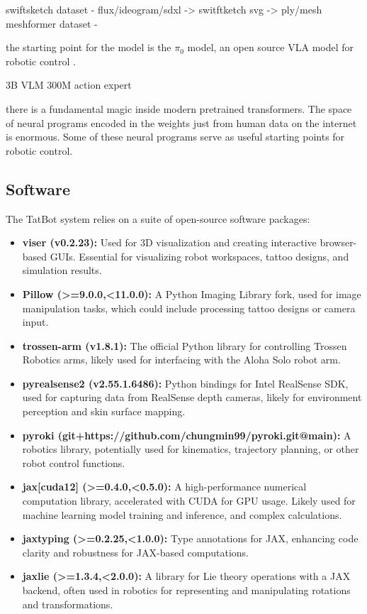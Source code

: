 \documentclass[11pt]{article}
\begin{document}
swiftsketch dataset - flux/ideogram/sdxl -> switftketch svg -> ply/mesh
meshformer dataset -

the starting point for the model is the $\pi_0$ model, an open source VLA model for robotic control \cite{Black2024pi0}.

3B VLM
300M action expert

there is a fundamental magic inside modern pretrained transformers.
The space of neural programs encoded in the weights just from human data on the internet is enormous. 
Some of these neural programs serve as useful starting points for robotic control.

\subsection{Software}

The TatBot system relies on a suite of open-source software packages:
\begin{itemize}
    \item \textbf{viser (v0.2.23):} Used for 3D visualization and creating interactive browser-based GUIs. Essential for visualizing robot workspaces, tattoo designs, and simulation results.
    \item \textbf{Pillow (>=9.0.0,<11.0.0):} A Python Imaging Library fork, used for image manipulation tasks, which could include processing tattoo designs or camera input.
    \item \textbf{trossen-arm (v1.8.1):} The official Python library for controlling Trossen Robotics arms, likely used for interfacing with the Aloha Solo robot arm.
    \item \textbf{pyrealsense2 (v2.55.1.6486):} Python bindings for Intel RealSense SDK, used for capturing data from RealSense depth cameras, likely for environment perception and skin surface mapping.
    \item \textbf{pyroki (git+https://github.com/chungmin99/pyroki.git@main):} A robotics library, potentially used for kinematics, trajectory planning, or other robot control functions.
    \item \textbf{jax[cuda12] (>=0.4.0,<0.5.0):} A high-performance numerical computation library, accelerated with CUDA for GPU usage. Likely used for machine learning model training and inference, and complex calculations.
    \item \textbf{jaxtyping (>=0.2.25,<1.0.0):} Type annotations for JAX, enhancing code clarity and robustness for JAX-based computations.
    \item \textbf{jaxlie (>=1.3.4,<2.0.0):} A library for Lie theory operations with a JAX backend, often used in robotics for representing and manipulating rotations and transformations.
\end{itemize}
\end{document}
